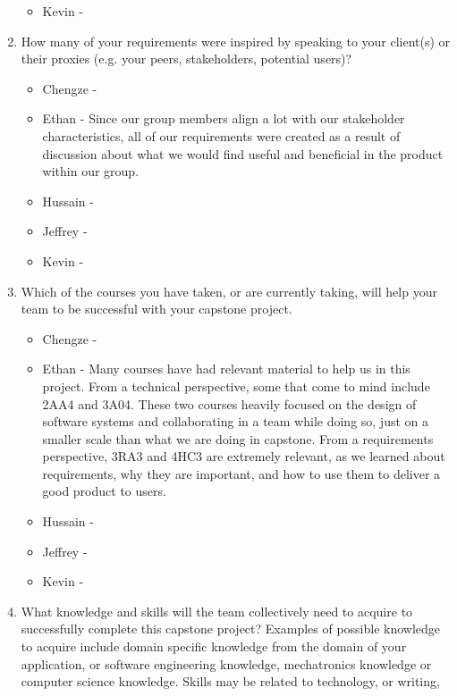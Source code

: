 \begin{enumerate}
\begin{itemize}
        \item Kevin - 
  \end{itemize} 
  \item How many of your requirements were inspired by speaking to your
  client(s) or their proxies (e.g. your peers, stakeholders, potential users)?
  \begin{itemize}
        \item Chengze - 
        \item Ethan - Since our group members align a lot with our stakeholder
          characteristics, all of our requirements were created as a result of
          discussion about what we would find useful and beneficial in the
          product within our group.
        \item Hussain - 
        \item Jeffrey - 
        \item Kevin - 
  \end{itemize} 
  \item Which of the courses you have taken, or are currently taking, will help
  your team to be successful with your capstone project.
  \begin{itemize}
        \item Chengze - 
        \item Ethan - Many courses have had relevant material to help us in
          this project. From a technical perspective, some that come to mind
          include 2AA4 and 3A04. These two courses heavily focused on the
          design of software systems and collaborating in a team while doing
          so, just on a smaller scale than what we are doing in capstone. From
          a requirements perspective, 3RA3 and 4HC3 are extremely relevant, as
          we learned about requirements, why they are important, and how to use
          them to deliver a good product to users.
        \item Hussain - 
        \item Jeffrey - 
        \item Kevin - 
  \end{itemize} 
  \item What knowledge and skills will the team collectively need to acquire to
  successfully complete this capstone project?  Examples of possible knowledge
  to acquire include domain specific knowledge from the domain of your
  application, or software engineering knowledge, mechatronics knowledge or
  computer science knowledge.  Skills may be related to technology, or writing,

\end{enumerate}
